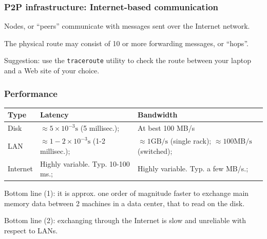 \documentclass{beamer}
\begin{document}
\begin{frame}
\frametitle{P2P infrastructure: Internet-based communication}

 Nodes, or ``peers'' communicate with messages
  sent over the Internet network.
  
  \vfill
  

\vfill

 The physical route may consist of 10 or more forwarding
  messages,  or ``hops''.
  
  \vfill
  
  Suggestion: use the \texttt{traceroute} utility to 
  check the route between your laptop and a Web site of your choice.
\end{frame}

\begin{frame}
\frametitle{Performance}

\begin{center}
\begin{small}

\begin{tabular}{l|p{5cm}|p{5cm}}
{\bf Type} & {\bf Latency} & \textbf{Bandwidth}\\
\hline
Disk & $\approx 5 \times
10^{-3}\mathrm{s}$ (5
millisec.); & At best 100 MB/s\\ 
LAN &  $\approx 1-2 \times
10^{-3}\mathrm{s}$ (1-2
millisec.);  &  $\approx 1 \mathrm{GB/s}$ (single rack);  $\approx 100
\mathrm{MB/s}$ (switched); \\
Internet &  Highly variable. Typ. 10-100 ms.;  &  Highly variable.
Typ. a few MB/s.;\\
\hline
\end{tabular}

Bottom line (1): it is approx. one order of magnitude faster to exchange main
memory data between 2 machines in a data center, that to read on the disk.

Bottom line (2): exchanging through the Internet is slow and unreliable with
respect to LANs.

\end{small}
\end{center}
\end{frame}
\end{document}
